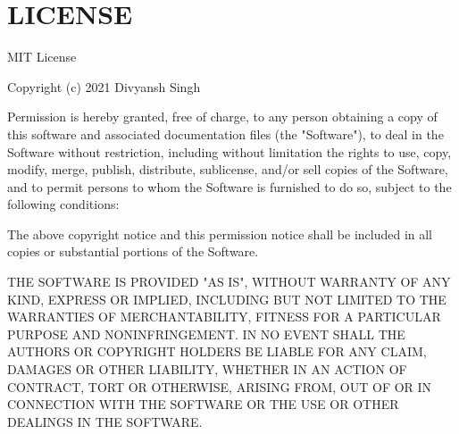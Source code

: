 \chapter{LICENSE}
\hypertarget{md_node__modules_2iron-webcrypto_2_l_i_c_e_n_s_e}{}\label{md_node__modules_2iron-webcrypto_2_l_i_c_e_n_s_e}
MIT License

Copyright (c) 2021 Divyansh Singh

Permission is hereby granted, free of charge, to any person obtaining a copy of this software and associated documentation files (the "{}\+Software"{}), to deal in the Software without restriction, including without limitation the rights to use, copy, modify, merge, publish, distribute, sublicense, and/or sell copies of the Software, and to permit persons to whom the Software is furnished to do so, subject to the following conditions\+:

The above copyright notice and this permission notice shall be included in all copies or substantial portions of the Software.

THE SOFTWARE IS PROVIDED "{}\+AS IS"{}, WITHOUT WARRANTY OF ANY KIND, EXPRESS OR IMPLIED, INCLUDING BUT NOT LIMITED TO THE WARRANTIES OF MERCHANTABILITY, FITNESS FOR A PARTICULAR PURPOSE AND NONINFRINGEMENT. IN NO EVENT SHALL THE AUTHORS OR COPYRIGHT HOLDERS BE LIABLE FOR ANY CLAIM, DAMAGES OR OTHER LIABILITY, WHETHER IN AN ACTION OF CONTRACT, TORT OR OTHERWISE, ARISING FROM, OUT OF OR IN CONNECTION WITH THE SOFTWARE OR THE USE OR OTHER DEALINGS IN THE SOFTWARE. 